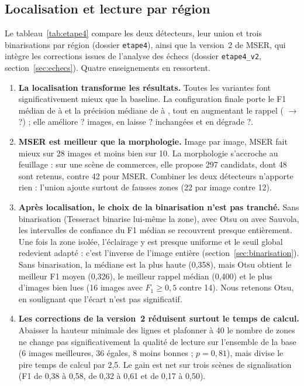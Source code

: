 \documentclass[11pt,a4paper]{article}
\newcommand{\finRmed}{?}\newcommand{\finCERmed}{?}\newcommand{\finMieux}{?}%
\newcommand{\finEgal}{?}\newcommand{\finPire}{?}\newcommand{\finP}{?}\newcommand{\facteurF}{?}}
\begin{document}
\subsection{Localisation et lecture par région}\label{sec:loc}
Le tableau~\ref{tab:etape4} compare les deux détecteurs, leur union et trois binarisations par région (dossier \texttt{etape4}), ainsi que la version~2 de MSER, qui intègre les corrections issues de l'analyse des échecs (dossier \texttt{etape4\_v2}, section~\ref{sec:echecs}). Quatre enseignements en ressortent.

\begin{enumerate}
\item \textbf{La localisation transforme les résultats.} Toutes les variantes font significativement mieux que la baseline. La configuration finale porte le F1 médian de \baseFmed{} à \finFmed{} et la précision médiane de \basePmed{} à \finPmed{}, tout en augmentant le rappel (\baseRmed{} $\to$ \finRmed) ; elle améliore \finMieux{} images, en laisse \finEgal{} inchangées et en dégrade \finPire{}.
\item \textbf{MSER est meilleur que la morphologie.} Image par image, MSER fait mieux sur 28 images et moins bien sur 10. La morphologie s'accroche au feuillage : sur une scène de commerces, elle propose 297 candidats, dont 48 sont retenus, contre 42 pour MSER. Combiner les deux détecteurs n'apporte rien : l'union ajoute surtout de fausses zones (22 par image contre 12).
\item \textbf{Après localisation, le choix de la binarisation n'est pas tranché.} Sans binarisation (Tesseract binarise lui-même la zone), avec Otsu ou avec Sauvola, les intervalles de confiance du F1 médian se recouvrent presque entièrement. Une fois la zone isolée, l'éclairage y est presque uniforme et le seuil global redevient adapté : c'est l'inverse de l'image entière (section~\ref{sec:binarisation}). Sans binarisation, la médiane est la plus haute (0,358), mais Otsu obtient le meilleur F1 moyen (0,326), le meilleur rappel médian (0,400) et le plus d'images bien lues (16 images avec $F_1 \ge 0{,}5$ contre 14). Nous retenons Otsu, en soulignant que l'écart n'est pas significatif.
\item \textbf{Les corrections de la version~2 réduisent surtout le temps de calcul.} Abaisser la hauteur minimale des lignes et plafonner à 40 le nombre de zones ne change pas significativement la qualité de lecture sur l'ensemble de la base (6 images meilleures, 36 égales, 8 moins bonnes ; $p = 0{,}81$), mais divise le pire temps de calcul par 2,5. Le gain est net sur trois scènes de signalisation (F1 de 0,38 à 0,58, de 0,32 à 0,61 et de 0,17 à 0,50).
\end{enumerate}
\end{document}

